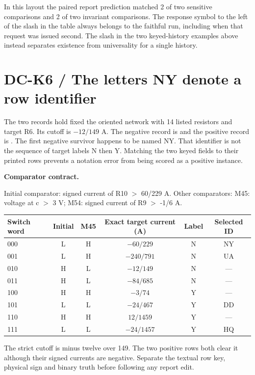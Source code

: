 \documentclass[12pt,letterpaper]{article}
\newcommand{\code}[1]{\texttt{\detokenize{#1}}}
\newcommand{\reading}[2]{\par\smallskip\textsf{\color{accent}\bfseries #1}\enspace #2\par}
\begin{document}
In this layout the paired report prediction matched 2 of two sensitive comparisons and 2 of two invariant comparisons. The response symbol to the left of the slash in the table always belongs to the faithful run, including when that request was issued second. The slash in the two keyed-history examples above instead separates existence from universality for a single history.

\clearpage\section{DC-K6 / The letters NY denote a row identifier}

The two records hold fixed the oriented network with 14 listed resistors and target R6. Its cutoff is $-12/149$ A. The negative record is \code{scope-20} and the positive record is \code{scope-23}. The first negative survivor happens to be named NY. That identifier is not the sequence of target labels N then Y. Matching the two keyed fields to their printed rows prevents a notation error from being scored as a positive instance.

\reading{Comparator contract.}{} Initial comparator: signed current of R10 $>$ 60/229 A. Other comparators: M45: voltage at c $>$ 3 V; M54: signed current of R9 $>$ -1/6 A.

\begin{center}\small\begin{tabular}{@{}lccccc@{}}\toprule
Switch word & Initial & M45 & Exact target current (A) & Label & Selected ID\\\midrule
000 & L & H & $-60/229$ & N & NY\\
001 & L & H & $-240/791$ & N & UA\\
010 & H & L & $-12/149$ & N & ---\\
011 & H & L & $-84/685$ & N & ---\\
100 & H & H & $-3/74$ & Y & ---\\
101 & L & L & $-24/467$ & Y & DD\\
110 & H & H & $12/1459$ & Y & ---\\
111 & L & L & $-24/1457$ & Y & HQ\\\bottomrule\end{tabular}\end{center}

The strict cutoff is minus twelve over 149. The two positive rows both clear it although their signed currents are negative. Separate the textual row key, physical sign and binary truth before following any report edit.
\end{document}
